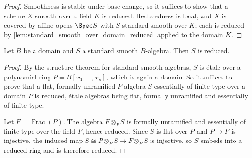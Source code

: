 \begin{proof}
  \leanok
  Smoothness is stable under base change, so it suffices to show that a scheme
  \(X\) smooth over a field \(K\) is reduced. Reducedness is local, and \(X\) is
  covered by affine opens \(\Spec S\) with \(S\) standard smooth over \(K\); each
  is reduced by \cref{lem:standard_smooth_over_domain_reduced} applied to the
  domain \(K\).
\end{proof}

\begin{lemma}
  \label{lem:standard_smooth_over_domain_reduced}
  \leanok
  Let \(B\) be a domain and \(S\) a standard smooth \(B\)-algebra. Then \(S\) is
  reduced.
\end{lemma}

\begin{proof}
  \leanok
  By the structure theorem for standard smooth algebras, \(S\) is étale over a
  polynomial ring \(P=B[x_1,\dots,x_n]\), which is again a domain. So it suffices
  to prove that a flat, formally unramified \(P\)-algebra \(S\) essentially of
  finite type over a domain \(P\) is reduced, étale algebras being flat, formally
  unramified and essentially of finite type.

  Let \(F=\operatorname{Frac}(P)\). The algebra \(F\otimes_P S\) is formally
  unramified and essentially of finite type over the field \(F\), hence reduced.
  Since \(S\) is flat over \(P\) and \(P\to F\) is injective, the induced map
  \(S\cong P\otimes_P S\to F\otimes_P S\) is injective, so \(S\) embeds into a
  reduced ring and is therefore reduced.
\end{proof}

